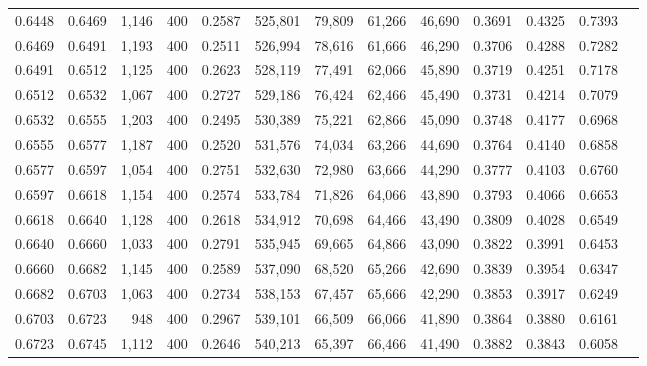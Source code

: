 \begin{tabular}{rrrrrrrrrrrrr}
0.6448 & 0.6469 &  1,146 & 400 &                                     0.2587 & 525,801 &  79,809 &  61,266 &  46,690 & 0.3691 & 0.4325 & 0.7393 \\
0.6469 & 0.6491 &  1,193 & 400 &                                     0.2511 & 526,994 &  78,616 &  61,666 &  46,290 & 0.3706 & 0.4288 & 0.7282 \\
0.6491 & 0.6512 &  1,125 & 400 &                                     0.2623 & 528,119 &  77,491 &  62,066 &  45,890 & 0.3719 & 0.4251 & 0.7178 \\
0.6512 & 0.6532 &  1,067 & 400 &                                     0.2727 & 529,186 &  76,424 &  62,466 &  45,490 & 0.3731 & 0.4214 & 0.7079 \\
0.6532 & 0.6555 &  1,203 & 400 &                                     0.2495 & 530,389 &  75,221 &  62,866 &  45,090 & 0.3748 & 0.4177 & 0.6968 \\
0.6555 & 0.6577 &  1,187 & 400 &                                     0.2520 & 531,576 &  74,034 &  63,266 &  44,690 & 0.3764 & 0.4140 & 0.6858 \\
0.6577 & 0.6597 &  1,054 & 400 &                                     0.2751 & 532,630 &  72,980 &  63,666 &  44,290 & 0.3777 & 0.4103 & 0.6760 \\
0.6597 & 0.6618 &  1,154 & 400 &                                     0.2574 & 533,784 &  71,826 &  64,066 &  43,890 & 0.3793 & 0.4066 & 0.6653 \\
0.6618 & 0.6640 &  1,128 & 400 &                                     0.2618 & 534,912 &  70,698 &  64,466 &  43,490 & 0.3809 & 0.4028 & 0.6549 \\
0.6640 & 0.6660 &  1,033 & 400 &                                     0.2791 & 535,945 &  69,665 &  64,866 &  43,090 & 0.3822 & 0.3991 & 0.6453 \\
0.6660 & 0.6682 &  1,145 & 400 &                                     0.2589 & 537,090 &  68,520 &  65,266 &  42,690 & 0.3839 & 0.3954 & 0.6347 \\
0.6682 & 0.6703 &  1,063 & 400 &                                     0.2734 & 538,153 &  67,457 &  65,666 &  42,290 & 0.3853 & 0.3917 & 0.6249 \\
0.6703 & 0.6723 &    948 & 400 &                                     0.2967 & 539,101 &  66,509 &  66,066 &  41,890 & 0.3864 & 0.3880 & 0.6161 \\
0.6723 & 0.6745 &  1,112 & 400 &                                     0.2646 & 540,213 &  65,397 &  66,466 &  41,490 & 0.3882 & 0.3843 & 0.6058 \\

\end{tabular}
